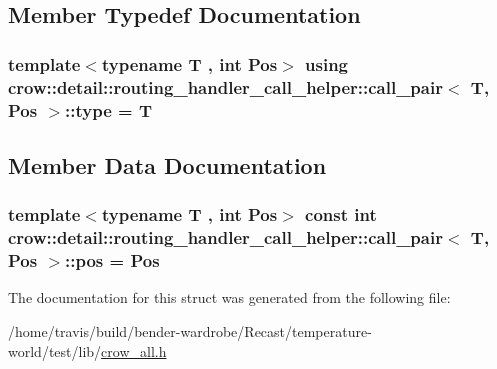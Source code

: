 \subsection{Member Typedef Documentation}
\hypertarget{structcrow_1_1detail_1_1routing__handler__call__helper_1_1call__pair_ac9c6c2efb5d7d0360e8950a314b336c5}{
\subsubsection[{type}]{\setlength{\rightskip}{0pt plus 5cm}template$<$typename T , int Pos$>$ using {\bf crow\-::detail\-::routing\-\_\-handler\-\_\-call\-\_\-helper\-::call\-\_\-pair}$<$ T, Pos $>$\-::{\bf type} =  T}}\label{structcrow_1_1detail_1_1routing__handler__call__helper_1_1call__pair_ac9c6c2efb5d7d0360e8950a314b336c5}


\subsection{Member Data Documentation}
\hypertarget{structcrow_1_1detail_1_1routing__handler__call__helper_1_1call__pair_a3308154ca21ab288c0dca19c2bd545af}{
\subsubsection[{pos}]{\setlength{\rightskip}{0pt plus 5cm}template$<$typename T , int Pos$>$ const int {\bf crow\-::detail\-::routing\-\_\-handler\-\_\-call\-\_\-helper\-::call\-\_\-pair}$<$ T, Pos $>$\-::pos = Pos\hspace{0.3cm}{\ttfamily [static]}}}\label{structcrow_1_1detail_1_1routing__handler__call__helper_1_1call__pair_a3308154ca21ab288c0dca19c2bd545af}


The documentation for this struct was generated from the following file\-:\begin{DoxyCompactItemize}
\item 
/home/travis/build/bender-\/wardrobe/\-Recast/temperature-\/world/test/lib/\hyperlink{crow__all_8h}{crow\-\_\-all.\-h}\end{DoxyCompactItemize}
